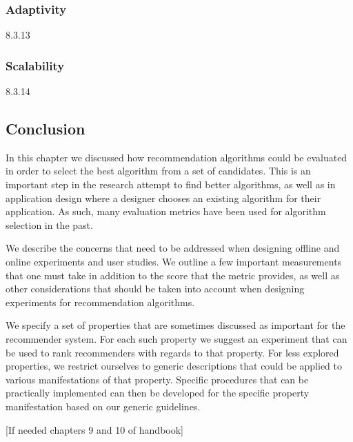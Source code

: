 \subsubsection{Adaptivity}
{8.3.13}

\subsubsection{Scalability}
{8.3.14}

\subsection{Conclusion}

In this chapter we discussed how recommendation algorithms could be evaluated in order to select the best algorithm from a set of candidates. This is an important step in the research attempt to find better algorithms, as well as in application design where a designer chooses an existing algorithm for their application. As such, many evaluation metrics have been used for algorithm selection in the past.

We describe the concerns that need to be addressed when designing offline and online experiments and user studies. We outline a few important measurements that one must take in addition to the score that the metric provides, as well as other considerations that should be taken into account when designing experiments for recommendation algorithms.

We specify a set of properties that are sometimes discussed as important for the recommender system. For each such property we suggest an experiment that can be used to rank recommenders with regards to that property. For less explored properties, we restrict ourselves to generic descriptions that could be applied to various manifestations of that property. Specific procedures that can be practically implemented can then be developed for the specific property manifestation based on our generic guidelines.

[If needed chapters 9 and 10 of handbook]
